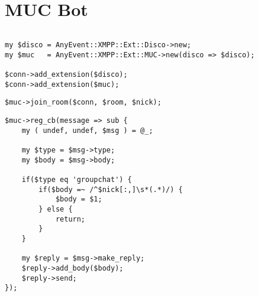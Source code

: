 \section*{MUC Bot}

\begin{shaded}
\inputminted{perl}{examples/muc-bot.pl}
\end{shaded}
\pause

\begin{shaded}
\begin{verbatim}
my $disco = AnyEvent::XMPP::Ext::Disco->new;
my $muc   = AnyEvent::XMPP::Ext::MUC->new(disco => $disco);

$conn->add_extension($disco);
$conn->add_extension($muc);
\end{verbatim}
\end{shaded}

\begin{shaded}
\begin{verbatim}
$muc->join_room($conn, $room, $nick);
\end{verbatim}
\end{shaded}

\begin{shaded}
\begin{verbatim}
$muc->reg_cb(message => sub {
    my ( undef, undef, $msg ) = @_;

    my $type = $msg->type;
    my $body = $msg->body;

    if($type eq 'groupchat') {
        if($body =~ /^$nick[:,]\s*(.*)/) {
            $body = $1;
        } else {
            return;
        }
    }

    my $reply = $msg->make_reply;
    $reply->add_body($body);
    $reply->send;
});
\end{verbatim}
\end{shaded}
